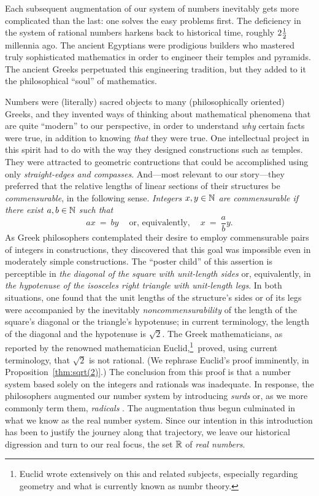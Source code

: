 Each subsequent augmentation of our system of numbers inevitably gets
more complicated than the last: one solves the easy problems first.
The deficiency in the system of rational numbers harkens back to
historical time, roughly $2 {1 \over 2}$ millennia ago.  The ancient
Egyptians were prodigious builders who mastered truly sophisticated
mathematics in order to engineer their temples and pyramids.  The
ancient Greeks perpetuated this engineering tradition, but they added
to it the philosophical ``soul'' of mathematics.

Numbers were (literally) sacred objects to many (philosophically
oriented) Greeks, and they invented ways of thinking about
mathematical phenomena that are quite ``modern'' to our perspective,
in order to understand {\em why} certain facts were true, in addition
to knowing {\em that} they were true.  One intellectual project in
this spirit had to do with the way they designed constructions such as
temples.  They were attracted to geometric contructions that could be
accomplished using only {\em straight-edges and compasses}.
And---most relevant to our story---they preferred that the relative
lengths of linear sections of their structures be {\em commensurable},
 in the
following sense.  {\em Integers $x,y \in \mathbb{N}$ are {\em commensurable}
  if there exist $a, b \in \mathbb{N}$ such that}
\[ 
ax \ = \ by \ \ \ \ \mbox{ or, equivalently, } \ \ \ \ x \ = \ \frac{a}{b} y.
\]
As Greek philosophers contemplated their desire to employ
commensurable pairs of integers in constructions, they discovered that
this goal was impossible even in moderately simple constructions.  The
``poster child'' of this assertion is perceptible in {\it the diagonal
  of the square with unit-length sides} or, equivalently, in {\it the
  hypotenuse of the isosceles right triangle with unit-length legs}.
In both situations, one found that the unit lengths of the structure's
sides or of its legs were accompanied by the inevitably {\em
  noncommensurability} of the length of the square's diagonal or the
triangle's hypotenuse; in current terminology, the length of the
diagonal and the hypotenuse is $\sqrt{2}$.  The Greek mathematicians,
as reported by the renowned mathematician
Euclid,\footnote{Euclid wrote extensively on this and related
  subjects, especially regarding geometry and what is currently known
  as numbr theory.}~proved, using current terminology, that $\sqrt{2}$
is not rational.  (We rephrase Euclid's proof imminently, in
Proposition~\ref{thm:sqrt(2)}.)  The conclusion from this proof is
that a number system based solely on the integers and rationals was
inadequate.  In response, the philosophers augmented our number system
by introducing {\it surds}  or, as we more commonly
term them, {\it radicals} .  The augmentation
thus begun culminated in what we know as the real number system.
Since our intention in this introduction has been to justify the
journey along that trajectory, we leave our historical digression and
turn to our real focus, the set $\mathbb{R}$ of {\it real numbers}.

